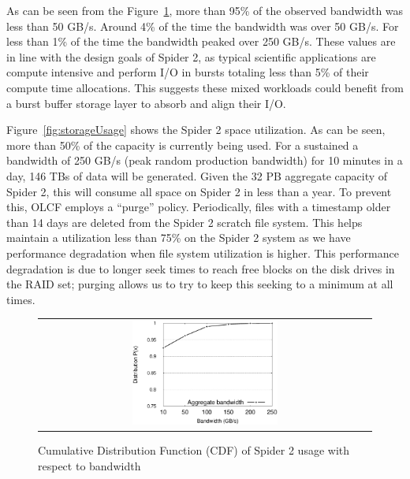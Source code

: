 As can be seen from the Figure~\ref{fig:bwUsage}, more than 95\% of the 
observed bandwidth was less than 50 GB/s. Around 4\% of the time the bandwidth
was over 50 GB/s. For less than 1\% of the time the bandwidth peaked over
250 GB/s. These values are in line with the design goals of Spider 2, as
typical scientific applications are compute intensive and perform
I/O in bursts totaling less than 5\% of their compute time allocations. This suggests these 
mixed workloads could benefit from a burst buffer storage layer to absorb and align 
their I/O.

Figure~\ref{fig:storageUsage} shows the Spider 2 space utilization. As can be
seen, more than 50\% of the capacity is currently being used.  For a sustained a
bandwidth of 250 GB/s (peak random production bandwidth) for 10 minutes in a
day, 146 TBs of data will be generated. Given the 32 PB aggregate capacity of
Spider 2, this will consume all space on Spider 2 in less than a year. To
prevent this, OLCF employs a ``purge'' policy. Periodically, files with a
timestamp older than 14 days are deleted from the Spider 2 scratch file system.
This helps maintain a utilization less than 75\% on the Spider 2 system as we 
have performance degradation when file system utilization is higher. This performance 
degradation is due to longer seek times to reach free blocks on the disk drives in the 
RAID set; purging allows us to try to keep this seeking to a minimum at all times.


\begin{figure}[!thb]
\begin{center}
\begin{tabular}{c}
{\includegraphics[width=0.45\textwidth]{./figs/spider2-bwCDF.eps}}\\
\end{tabular}
\vspace{-0.1in}
\caption{Cumulative Distribution Function (CDF) of Spider 2 usage with respect to bandwidth}
\label{fig:bwUsage}
\end{center}
\end{figure}



